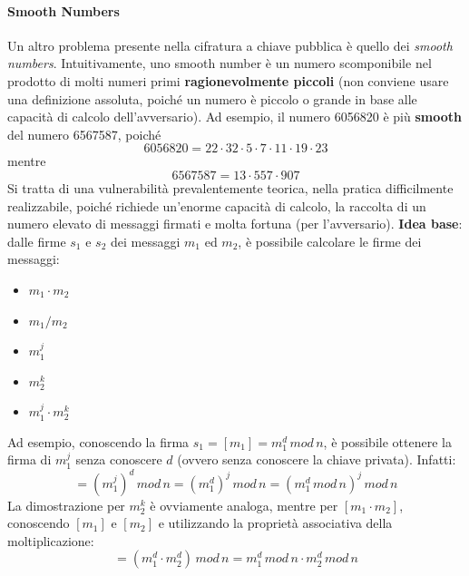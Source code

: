 \paragraph{Smooth Numbers}
Un altro problema presente nella cifratura a chiave pubblica è quello dei \textit{smooth numbers}. Intuitivamente, uno smooth number è un numero scomponibile nel prodotto di molti numeri primi \textbf{ragionevolmente piccoli} (non conviene usare una definizione assoluta, poiché un numero è piccolo o grande in base alle capacità di calcolo dell'avversario). Ad esempio, il numero 6056820 è più \textbf{smooth} del numero 6567587, poiché 
\begin{equation}
6056820 = 22 \cdot 32 \cdot 5 \cdot 7 \cdot 11 \cdot 19 \cdot 23
\end{equation}
mentre
\begin{equation}
6567587 = 13 \cdot 557 \cdot 907
\end{equation}
Si tratta di una vulnerabilità prevalentemente teorica, nella pratica difficilmente realizzabile, poiché richiede un'enorme capacità di calcolo, la raccolta di un numero elevato di messaggi firmati e molta fortuna (per l'avversario). 
\newline \newline
\textbf{Idea base}: dalle firme $s_{1}$ e $s_{2}$ dei messaggi $m_{1}$ ed $m_{2}$, è possibile calcolare le firme dei messaggi:
\begin{itemize}
\item $m_{1} \cdot m_{2}$
\item $m_{1}/m_{2}$
\item $m_{1}^j$
\item $m_{2}^k$ 
\item $m_{1}^j \cdot m_{2}^k$
\end{itemize} 
Ad esempio, conoscendo la firma $s_{1} = [m_{1}] = m_{1}^d \, mod \, n $, è possibile ottenere la firma di $m_{1}^j$ senza conoscere $d$ (ovvero senza conoscere la chiave privata). Infatti:
\begin{equation}
[m_1^j] = (m_{1}^j)^d \, mod \, n = (m_{1}^d)^j \, mod \, n = (m_{1}^d \, mod \, n)^j \, mod \, n
\end{equation} 
La dimostrazione per $m_{2}^k$  è ovviamente analoga, mentre per $[m_{1} \cdot m_{2}]$, conoscendo $[m_{1}]$ e $[m_{2}]$ e utilizzando la proprietà associativa della moltiplicazione:
\begin{equation}
[m_{1} \cdot m_{2}] = (m_{1}^d \cdot m_{2}^d) \, mod \, n = m_{1}^d \, mod \, n \cdot m_{2}^d \, mod \, n
\end{equation}
